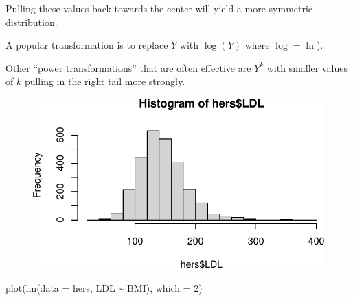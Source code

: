 \documentclass[
  letterpaper,
  DIV=11,
  numbers=noendperiod]{scrreport}
\newenvironment{Shaded}{\begin{snugshade}}{\end{snugshade}}
\newcommand{\AttributeTok}[1]{\textcolor[rgb]{0.40,0.45,0.13}{#1}}
\newcommand{\DecValTok}[1]{\textcolor[rgb]{0.68,0.00,0.00}{#1}}
\newcommand{\FunctionTok}[1]{\textcolor[rgb]{0.28,0.35,0.67}{#1}}
\newcommand{\NormalTok}[1]{\textcolor[rgb]{0.00,0.23,0.31}{#1}}
\newcommand{\SpecialCharTok}[1]{\textcolor[rgb]{0.37,0.37,0.37}{#1}}
\begin{document}
Pulling these values back towards the center will yield a more symmetric
distribution.

A popular transformation is to replace \(Y\) with \(\log (Y)\) where
\(\log = \ln\)).

Other ``power transformations'' that are often effective are \(Y^k\)
with smaller values of \(k\) pulling in the right tail more strongly.

\begin{Shaded}
\end{Shaded}

\begin{figure}[H]

{\centering \includegraphics{week4/week4_files/figure-pdf/unnamed-chunk-4-1.pdf}

}

\end{figure}

\begin{Shaded}
\begin{Highlighting}[]
\FunctionTok{plot}\NormalTok{(}\FunctionTok{lm}\NormalTok{(}\AttributeTok{data =}\NormalTok{ hers, LDL }\SpecialCharTok{\textasciitilde{}}\NormalTok{ BMI), }\AttributeTok{which =} \DecValTok{2}\NormalTok{)}
\end{Highlighting}
\end{Shaded}
\end{document}
